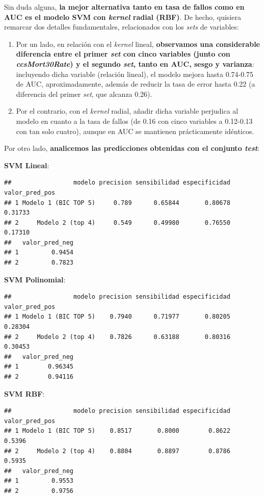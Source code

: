 \documentclass[
]{article}
\begin{document}
Sin duda alguna, \textbf{la mejor alternativa tanto en tasa de fallos
como en AUC es el modelo SVM con \emph{kernel} radial (RBF)}. De hecho,
quisiera remarcar dos detalles fundamentales, relacionados con los
\emph{sets} de variables:

\begin{enumerate}
\def\labelenumi{\arabic{enumi}.}
\item
  Por un lado, en relación con el \emph{kernel} lineal,
  \textbf{observamos una considerable diferencia entre el primer
  \emph{set} con cinco variables (junto con \emph{ccsMort30Rate}) y el
  segundo \emph{set}, tanto en AUC, sesgo y varianza}: incluyendo dicha
  variable (relación lineal), el modelo mejora hasta 0.74-0.75 de AUC,
  aproximadamente, además de reducir la tasa de error hasta 0.22 (a
  diferencia del primer \emph{set}, que alcanza 0.26).
\item
  Por el contrario, con el \emph{kernel} radial, añadir dicha variable
  perjudica al modelo en cuanto a la tasa de fallos (de 0.16 con cinco
  variables a 0.12-0.13 con tan solo cuatro), aunque en AUC se mantienen
  prácticamente idénticos.
\end{enumerate}

Por otro lado, \textbf{analicemos las predicciones obtenidas con el
conjunto \emph{test}}:

\textbf{SVM Lineal}:

\begin{verbatim}
##                 modelo precision sensibilidad especificidad valor_pred_pos
## 1 Modelo 1 (BIC TOP 5)     0.789      0.65844       0.80678        0.31733
## 2     Modelo 2 (top 4)     0.549      0.49980       0.76550        0.17310
##   valor_pred_neg
## 1         0.9454
## 2         0.7823
\end{verbatim}

\textbf{SVM Polinomial}:

\begin{verbatim}
##                 modelo precision sensibilidad especificidad valor_pred_pos
## 1 Modelo 1 (BIC TOP 5)    0.7940      0.71977       0.80205        0.28304
## 2     Modelo 2 (top 4)    0.7826      0.63188       0.80316        0.30453
##   valor_pred_neg
## 1        0.96345
## 2        0.94116
\end{verbatim}

\textbf{SVM RBF}:

\begin{verbatim}
##                 modelo precision sensibilidad especificidad valor_pred_pos
## 1 Modelo 1 (BIC TOP 5)    0.8517       0.8000        0.8622         0.5396
## 2     Modelo 2 (top 4)    0.8804       0.8897        0.8786         0.5935
##   valor_pred_neg
## 1         0.9553
## 2         0.9756
\end{verbatim}
\end{document}
